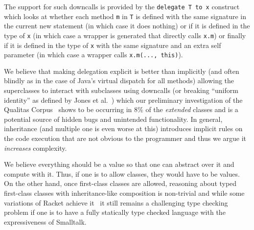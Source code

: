 \documentclass[preprint]{sigplanconf}
\begin{document}
The support for such downcalls is provided by the \texttt{delegate T to x} construct which looks at whether each method \texttt{m} in \texttt{T} is defined with the same signature in the current new statement (in which case it does nothing) or if it is defined in the type of \texttt{x} (in which case a wrapper is generated that directly calls \texttt{x.m}) or finally if it is defined in the type of \texttt{x} with the same signature and an extra self parameter (in which case a wrapper calls \texttt{x.m(..., this)}).

We believe that making delegation explicit is better than implicitly (and often blindly as in the case of Java's virtual dispatch for all methods) allowing the superclasses to interact with subclasses using downcalls (or breaking ``uniform identity'' as defined by Jones et al.~\cite{jones:2016:inheritance}) which our preliminary investigation of the Qualitas Corpus~\cite{QualitasCorpus:APSEC:2010} shows to be occurring in $8\%$ of the \textit{extended} classes and is a potential source of hidden bugs and unintended functionality. In general, inheritance (and multiple one is even worse at this) introduces implicit rules on the code execution that are not obvious to the programmer and thus we argue it \textit{increases} complexity.

We believe everything should be a value so that one can abstract over it and compute with it. Thus, if one is to allow classes, they would have to be values. On the other hand, once first-class classes are allowed, reasoning about typed first-class classes with inheritance-like composition is non-trivial and while some variations of Racket achieve it~\cite{Takikawa:2012:GTF:2384616.2384674} it still remains a challenging type checking problem if one is to have a fully statically type checked language with the expressiveness of Smalltalk.




\end{document}

